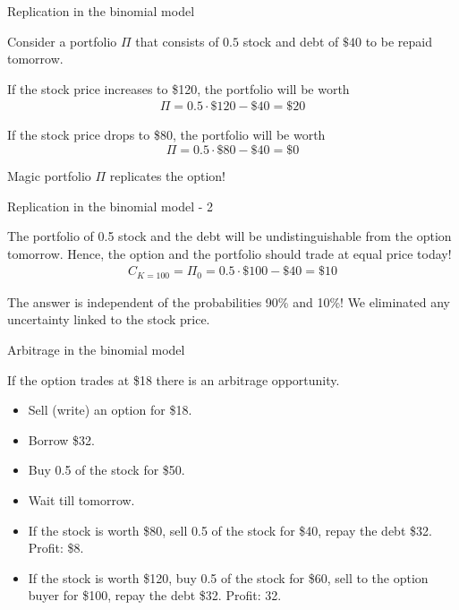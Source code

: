 \documentclass{beamer}
\begin{document}
\begin{frame}{Replication in the binomial model}
\centering
{}

\justify
Consider a portfolio $\Pi$ that consists of $0.5$ stock and debt of $\$40$ to be repaid tomorrow.

\justify
If the stock price increases to \$120, the portfolio will be worth
\begin{align*}\Pi = 0.5\cdot\$120 - \$40 = \$20\end{align*}

\justify
If the stock price drops to \$80, the portfolio will be worth
$$\Pi = 0.5 \cdot \$80 - \$40 = \$0$$

\justify
Magic portfolio  $\Pi$ \alert{replicates} the option!
\end{frame}



\begin{frame}{Replication in the binomial model - 2 }
\centering
{}


\justify
The portfolio of 0.5 stock and the debt will be undistinguishable from the option \alert{tomorrow}. Hence, the option and the portfolio should trade at equal price \alert{today}!
\begin{align*}
C_{K=100} = \Pi_0 = 0.5 \cdot \$100 - \$40 = \$10
\end{align*}

\justify
The answer is independent of the probabilities 90\% and 10\%! We eliminated any uncertainty linked to the stock price.
\end{frame}



\begin{frame}{Arbitrage in the binomial model}
\centering
{}

\justify
If the option trades at \$18 there is an arbitrage opportunity.
\begin{itemize}
\item Sell (write) an option for \$18.
\item Borrow \$32.
\item Buy 0.5 of the stock for \$50.
\item Wait till tomorrow.
\item If the stock is worth \$80, sell 0.5 of the stock for \$40, repay the debt \$32. Profit: \$8.
\item If the stock is worth \$120, buy 0.5 of the stock for \$60, sell to the option buyer for \$100, repay the debt \$32. Profit: 32.
\end{itemize}
\end{frame}
\end{document}
